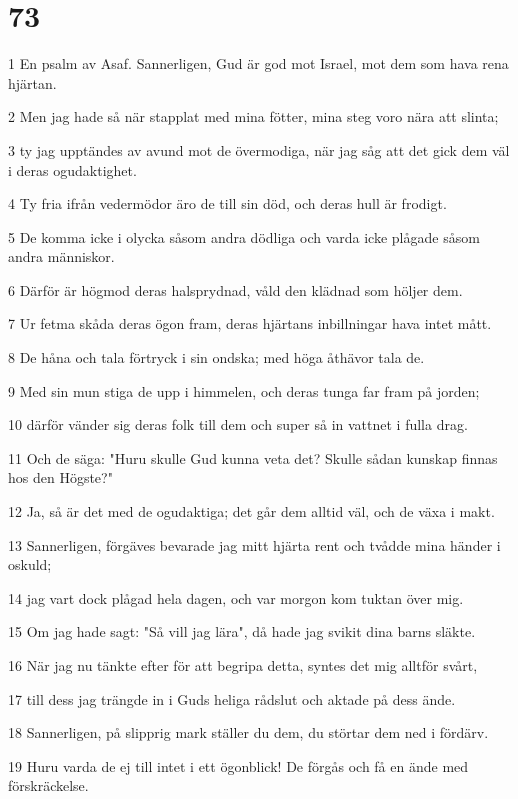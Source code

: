\chapter{73}

\par 1 En psalm av Asaf. Sannerligen, Gud är god mot Israel, mot dem som hava rena hjärtan.
\par 2 Men jag hade så när stapplat med mina fötter, mina steg voro nära att slinta;
\par 3 ty jag upptändes av avund mot de övermodiga, när jag såg att det gick dem väl i deras ogudaktighet.
\par 4 Ty fria ifrån vedermödor äro de till sin död, och deras hull är frodigt.
\par 5 De komma icke i olycka såsom andra dödliga och varda icke plågade såsom andra människor.
\par 6 Därför är högmod deras halsprydnad, våld den klädnad som höljer dem.
\par 7 Ur fetma skåda deras ögon fram, deras hjärtans inbillningar hava intet mått.
\par 8 De håna och tala förtryck i sin ondska; med höga åthävor tala de.
\par 9 Med sin mun stiga de upp i himmelen, och deras tunga far fram på jorden;
\par 10 därför vänder sig deras folk till dem och super så in vattnet i fulla drag.
\par 11 Och de säga: "Huru skulle Gud kunna veta det? Skulle sådan kunskap finnas hos den Högste?"
\par 12 Ja, så är det med de ogudaktiga; det går dem alltid väl, och de växa i makt.
\par 13 Sannerligen, förgäves bevarade jag mitt hjärta rent och tvådde mina händer i oskuld;
\par 14 jag vart dock plågad hela dagen, och var morgon kom tuktan över mig.
\par 15 Om jag hade sagt: "Så vill jag lära", då hade jag svikit dina barns släkte.
\par 16 När jag nu tänkte efter för att begripa detta, syntes det mig alltför svårt,
\par 17 till dess jag trängde in i Guds heliga rådslut och aktade på dess ände.
\par 18 Sannerligen, på slipprig mark ställer du dem, du störtar dem ned i fördärv.
\par 19 Huru varda de ej till intet i ett ögonblick! De förgås och få en ände med förskräckelse.
